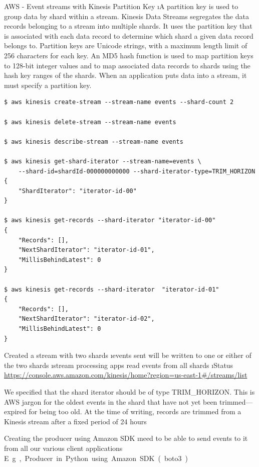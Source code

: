 \begin{frame}{AWS - Event streams with Kinesis}
Partition Key
\i A partition key is used to group data by shard within a stream. Kinesis Data Streams segregates the data records belonging to a stream into multiple shards. It uses the partition key that is associated with each data record to determine which shard a given data record belongs to. Partition keys are Unicode strings, with a maximum length limit of 256 characters for each key. An MD5 hash function is used to map partition keys to 128-bit integer values and to map associated data records to shards using the hash key ranges of the shards. When an application puts data into a stream, it must specify a partition key. 

\begin{lstlisting}
$ aws kinesis create-stream --stream-name events --shard-count 2

$ aws kinesis delete-stream --stream-name events

$ aws kinesis describe-stream --stream-name events

$ aws kinesis get-shard-iterator --stream-name=events \
    --shard-id=shardId-000000000000 --shard-iterator-type=TRIM_HORIZON
{
    "ShardIterator": "iterator-id-00"
}

$ aws kinesis get-records --shard-iterator "iterator-id-00"
{
    "Records": [],
    "NextShardIterator": "iterator-id-01",
    "MillisBehindLatest": 0
}

$ aws kinesis get-records --shard-iterator  "iterator-id-01"
{
    "Records": [],
    "NextShardIterator": "iterator-id-02",
    "MillisBehindLatest": 0
}
\end{lstlisting}

Created a stream with two shards
\i events sent will be written to one or either of the two shards
\i stream processing apps read events from all shards
\i Status {\footnotesize\url{https://console.aws.amazon.com/kinesis/home?region=us-east-1#/streams/list}}

We specified that the shard iterator should be of type TRIM\_HORIZON. This is AWS jargon
for the oldest events in the shard that have not yet been trimmed—expired for
being too old. At the time of writing, records are trimmed from a Kinesis stream after
a fixed period of 24 hours

\framebreak

Creating the producer using Amazon SDK
\i need to be able to send events to it from all our various client applications
\si E.g., Producer in Python using Amazon SDK (boto3)
\end{frame}

